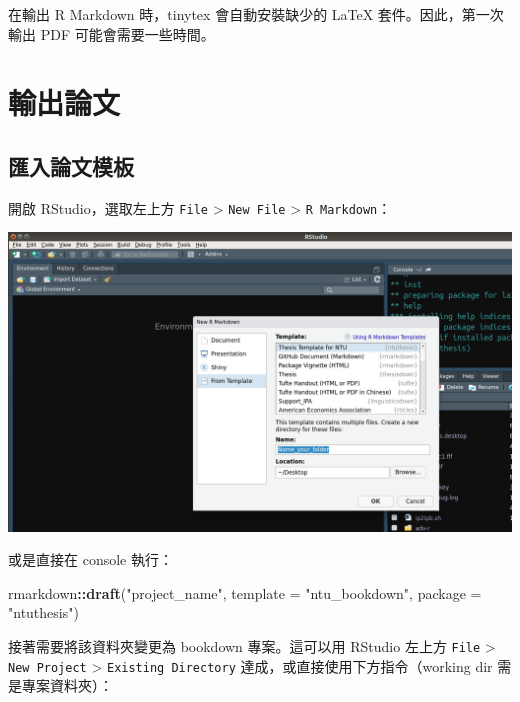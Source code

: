 \documentclass[oneside]{book}
\newenvironment{Shaded}{\begin{snugshade}}{\end{snugshade}}
\newcommand{\KeywordTok}[1]{\textcolor[rgb]{0.13,0.29,0.53}{\textbf{#1}}}
\newcommand{\DataTypeTok}[1]{\textcolor[rgb]{0.13,0.29,0.53}{#1}}
\newcommand{\StringTok}[1]{\textcolor[rgb]{0.31,0.60,0.02}{#1}}
\newcommand{\OperatorTok}[1]{\textcolor[rgb]{0.81,0.36,0.00}{\textbf{#1}}}
\newcommand{\NormalTok}[1]{#1}
\theoremstyle{definition}
\theoremstyle{definition}
\theoremstyle{definition}
\theoremstyle{remark}
\begin{document}
在輸出 R Markdown 時，tinytex 會自動安裝缺少的 LaTeX
套件。因此，第一次輸出 PDF 可能會需要一些時間。

\chapter{輸出論文}\label{export-thesis}

\section{匯入論文模板}\label{import-template}

開啟 RStudio，選取左上方 \texttt{File} \textgreater{} \texttt{New\ File}
\textgreater{} \texttt{R\ Markdown}：

\begin{center}\includegraphics[width=1\linewidth]{figs/rmd-template} \end{center}

或是直接在 console 執行：

\begin{Shaded}
\begin{Highlighting}[]
\NormalTok{rmarkdown}\OperatorTok{::}\KeywordTok{draft}\NormalTok{(}\StringTok{"project_name"}\NormalTok{,}
                 \DataTypeTok{template =} \StringTok{"ntu_bookdown"}\NormalTok{,}
                 \DataTypeTok{package =} \StringTok{"ntuthesis"}\NormalTok{)}
\end{Highlighting}
\end{Shaded}

接著需要將該資料夾變更為 bookdown 專案。這可以用 RStudio 左上方
\texttt{File} \textgreater{} \texttt{New\ Project} \textgreater{}
\texttt{Existing\ Directory} 達成，或直接使用下方指令（working dir
需是專案資料夾）：
\end{document}

